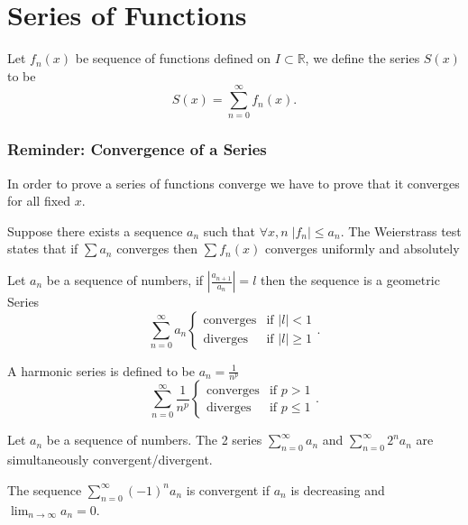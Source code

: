 \part{Series of Functions}

\begin{definition}
    Let $f_n(x)$ be sequence of functions defined on $I\subset\mathbb{R}$, we define the series $S(x)$ to be 
    \[
    S(x)=\sum_{n=0}^{\infty} f_n(x)
    .\] 
\end{definition}

\section{Reminder: Convergence of a Series}
In order to prove a series of functions converge we have to prove that it converges for all fixed $x$.
\begin{theorem}
    Suppose there exists a sequence $a_n$ such that $\forall x,n \; |f_n|\le a_n$. The Weierstrass test states that if $\sum a_n$ converges then $\sum f_n(x)$ converges uniformly and absolutely
\end{theorem}

\begin{theorem}
    Let $a_n$ be a sequence of numbers, if $\left| \frac{a_{n+1}}{a_n} \right| =l$ then the sequence is a geometric Series
    \[
        \sum_{n=0}^\infty a_n \begin{cases} \text{converges}&\text{if } |l|<1\\
        \text{diverges}&\text{if }|l|\ge 1\end{cases} 
    .\] 
\end{theorem}

\begin{theorem}
    A harmonic series is defined to be $a_n=\frac{1}{n^p}$
    \[
        \sum_{n=0}^\infty \frac{1}{n^p} \begin{cases} \text{converges}&\text{if } p>1\\
        \text{diverges}&\text{if }p\le 1\end{cases} 
    .\] 

\end{theorem}


\begin{theorem}
    Let $a_n$ be a sequence of numbers. The 2 series $\sum_{n=0}^{\infty} a_n$ and $\sum_{n=0}^{\infty} 2^na_n$ are simultaneously convergent/divergent.
\end{theorem}


\begin{theorem}
    The sequence $\sum_{n=0}^{\infty} (-1)^na_n$ is convergent if $a_n$ is decreasing and $\lim_{n \to \infty}a_n =0$.
\end{theorem}

